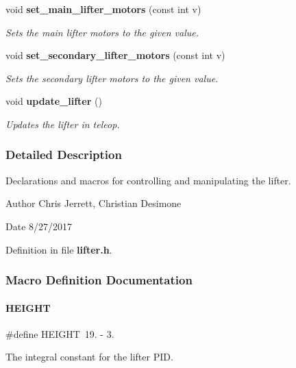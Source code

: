\begin{DoxyCompactItemize}
void \textbf{ set\+\_\+main\+\_\+lifter\+\_\+motors} (const int v)
\begin{DoxyCompactList}\small\item\em Sets the main lifter motors to the given value. \end{DoxyCompactList}\item 
void \textbf{ set\+\_\+secondary\+\_\+lifter\+\_\+motors} (const int v)
\begin{DoxyCompactList}\small\item\em Sets the secondary lifter motors to the given value. \end{DoxyCompactList}\item 
void \textbf{ update\+\_\+lifter} ()
\begin{DoxyCompactList}\small\item\em Updates the lifter in teleop. \end{DoxyCompactList}\end{DoxyCompactItemize}


\subsubsection{Detailed Description}
Declarations and macros for controlling and manipulating the lifter. 

\begin{DoxyAuthor}{Author}
Chris Jerrett, Christian Desimone 
\end{DoxyAuthor}
\begin{DoxyDate}{Date}
8/27/2017 
\end{DoxyDate}


Definition in file \textbf{ lifter.\+h}.



\subsubsection{Macro Definition Documentation}
\mbox{\label{a00026_aed89bd71aee8be823e8a20ec4e093c1e}} 
\paragraph{H\+E\+I\+G\+HT}
{\footnotesize\ttfamily \#define H\+E\+I\+G\+HT~19. -\/ 3.}



The integral constant for the lifter P\+ID. 



